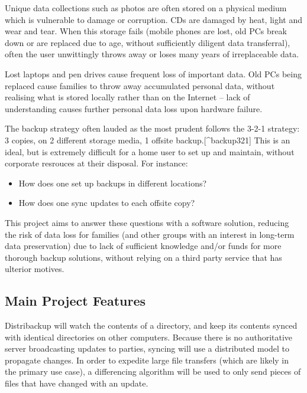 \documentclass[12pt,a4paper,]{book}
\begin{document}
Unique data collections such as photos are often stored on a physical
medium which is vulnerable to damage or corruption. CDs are damaged by
heat, light and wear and tear. When this storage fails (mobile phones
are lost, old PCs break down or are replaced due to age, without
sufficiently diligent data transferral), often the user unwittingly
throws away or loses many years of irreplaceable data.

Lost laptops and pen drives cause frequent loss of important data. Old
PCs being replaced cause families to throw away accumulated personal
data, without realising what is stored locally rather than on the
Internet -- lack of understanding causes further personal data loss upon
hardware failure.

The backup strategy often lauded as the most prudent follows the 3-2-1
strategy: 3 copies, on 2 different storage media, 1 offsite
backup.{[}\^{}backup321{]} This is an ideal, but is extremely difficult
for a home user to set up and maintain, without corporate resrouces at
their disposal. For instance:

\begin{itemize}
\itemsep1pt\parskip0pt
\item
  How does one set up backups in different locations?
\item
  How does one sync updates to each offsite copy?
\end{itemize}

This project aims to answer these questions with a software solution,
reducing the risk of data loss for families (and other groups with an
interest in long-term data preservation) due to lack of sufficient
knowledge and/or funds for more thorough backup solutions, without
relying on a third party service that has ulterior motives.

\subsection{Main Project Features}\label{main-project-features}

Distribackup will watch the contents of a directory, and keep its
contents synced with identical directories on other computers. Because
there is no authoritative server broadcasting updates to parties,
syncing will use a distributed model to propagate changes. In order to
expedite large file transfers (which are likely in the primary use
case), a differencing algorithm will be used to only send pieces of
files that have changed with an update.
\end{document}
